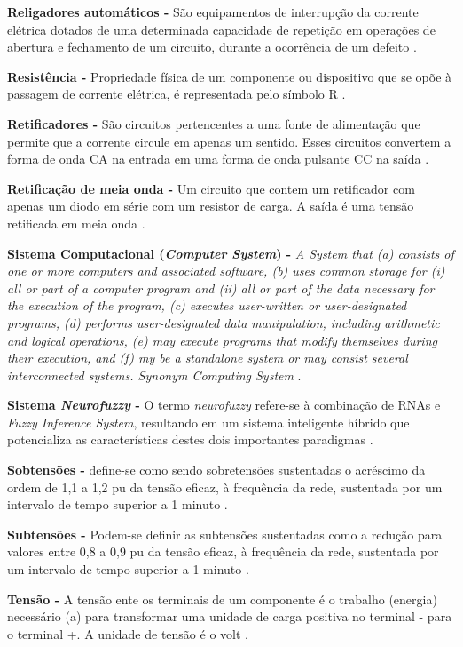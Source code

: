 \noindent
\textbf{Religadores automáticos -} São equipamentos de interrupção da corrente elétrica dotados de uma determinada capacidade de repetição em operações de abertura e fechamento de um circuito, durante a ocorrência de um defeito \citep{FIL05}. 

\noindent
\textbf{Resistência -} Propriedade física de um componente ou dispositivo que se opõe à passagem de corrente elétrica, é representada pelo símbolo R \citep{DOR08}.

\noindent
\textbf{Retificadores -} São circuitos pertencentes a uma fonte de alimentação que permite que a corrente circule em apenas um sentido. Esses circuitos convertem a forma de onda CA na entrada em uma forma de onda pulsante CC na saída \citep{MAL07}.

\noindent
\textbf{Retificação de meia onda -} Um circuito que contem um retificador com apenas um diodo em série com um resistor de carga. A saída é uma tensão retificada em meia onda \citep{MAL07}.

\noindent
\textbf{Sistema Computacional (\textit{Computer System}) -} \textit{A System that (a) consists of one or more computers and associated software, (b) uses common storage for (i) all or part of a computer program and (ii) all or part of the data necessary for the execution of the program, (c) executes user-written or user-designated programs, (d) performs user-designated data manipulation, including arithmetic and logical operations, (e) may execute programs that modify themselves during their execution, and (f) my be a standalone system or may consist several interconnected systems. Synonym Computing System} \citep{WEI00}.

\noindent
\textbf{Sistema \textit{Neurofuzzy} -} O termo \textit{neurofuzzy} refere-se à combinação de RNAs e \textit{Fuzzy Inference System}, resultando em um sistema inteligente híbrido que potencializa as características destes dois importantes paradigmas \citep{JAC10}.

\noindent
\textbf{Sobtensões -} define-se como sendo sobretensões sustentadas o acréscimo da ordem de 1,1 a 1,2 pu da tensão eficaz, à frequência da rede, sustentada por um intervalo de tempo superior a 1 minuto \citep{JUN09}.

\noindent
\textbf{Subtensões -} Podem-se definir as subtensões sustentadas como a redução para valores entre 0,8 a 0,9 pu da tensão eficaz, à frequência da rede, sustentada por um intervalo de tempo superior a 1 minuto \citep{JUN09}.

\noindent
\textbf{Tensão -} A tensão ente os terminais de um componente é o trabalho (energia) necessário (a) para transformar uma unidade de carga positiva no terminal - para o terminal +. A unidade de tensão é o volt \citep{DOR08}.

